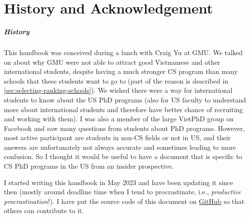 \documentclass[oneside,11pt]{book}
\newenvironment{commentbox}[1][]{
  \small
  \begin{mybox}
    {\small \textbf{#1}}
  }{
  \end{mybox}
}
\begin{document}





\chapter{History and Acknowledgement}\label{sec:ack}

\paragraph{History} This handbook was conceived during a lunch with Craig Yu at GMU.  We talked on about why GMU were not able to attract good Vietnamese and other international students, despite having a much stronger CS program than many schools that these students want to go to (part of the reason is described in \autoref{sec:selecting-ranking-schools}). We wished there were a way for international students to know about the US PhD programs (also for US faculty to understand more about international students and therefore have better chance of recruiting and working with them). I was also a member of the large VietPhD group on Facebook and saw many questions from students about PhD programs.  However, most active participant are students in non-CS fields or not in US, and their answers are unfortunately not always accurate and sometimes leading to more confusion. So I thought it would be useful to have a document that is specific to CS PhD programs in the US from an insider prospective.

I started writing this handbook in May 2023 and have been updating it since then (mostly around deadline time when I tend to procrastinate, i.e., \emph{productive procrastination}!). I have put the source code of this document on \href{https://github.com/nguyenthanhvuh/phd-cs-us}{GitHub} so that others can contribute to it.
\end{document}
